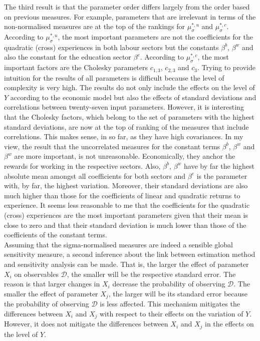 The third result is that the parameter order differs largely from the order based on previous measures.
For example, parameters that are irrelevant in terms of the non-normalised measures are at the top of the rankings for $\mu^{*,u}_{\sigma}$ and $\mu^{*,c}_{\sigma}$. According to $\mu^{*,u}_{\sigma}$, the most important parameters are not the coefficients for the quadratic (cross) experiences in both labour sectors but the constants $\beta^b$, $\beta^w$ and also the constant for the education sector $\beta^e$. According to $\mu^{*,c}_{\sigma}$, the most important factors are the Cholesky parameters $c_{1,3}$, $c_{2,3}$ and $c_{3}$. Trying to provide intuition for the results of all parameters is difficult because the level of complexity is very high. The results do not only include the effects on the level of $Y$ according to the economic model but also the effects of standard deviations and correlations between twenty-seven input parameters. However, it is interesting that the Cholesky factors, which belong to the set of parameters with the highest standard deviations, are now at the top of ranking of the measures that include correlations. This makes sense, in so far, as they have high covariances. In my view, the result that the uncorrelated measures for the constant terms $\beta^b$, $\beta^w$ and $\beta^w$ are more important, is not unreasonable. Economically, they anchor the rewards for working in the respective sectors. Also, $\beta^b$, $\beta^w$ have by far the highest absolute mean amongst all coefficients for both sectors and $\beta^e$ is the parameter with, by far, the highest variation. Moreover, their standard deviations are also much higher than those for the coefficients of linear and quadratic returns to experience. It seems less reasonable to me that the coefficients for the quadratic (cross) experiences are the most important parameters given that their mean is close to zero and that their standard deviation is much lower than those of the coefficients of the constant terms.\\

\noindent
Assuming that the sigma-normalised measures are indeed a sensible global sensitivity measure, a second inference about the link between estimation method and sensitivity analysis can be made. That is, the larger the effect of parameter $X_i$ on observables $\pmb{\mathcal{D}}$, the smaller will be the respective standard error. The reason is that larger changes in $X_i$ decrease the probability of observing $\pmb{\mathcal{D}}$. The smaller the effect of parameter $X_j$, the larger will be its standard error because the probability of observing $\pmb{\mathcal{D}}$ is less affected. This mechanism mitigates the differences between $X_i$ and $X_j$ with respect to their effects on the variation of $Y$. However, it does not mitigate the differences between $X_i$ and $X_j$ in the effects on the level of $Y$.\\


